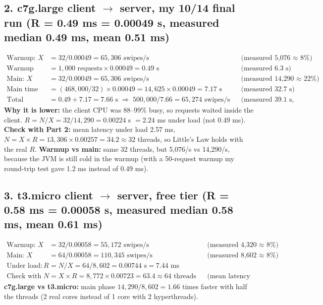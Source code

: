 \documentclass[10pt]{article}
\begin{document}
{\subsection*{2. c7g.large client $\to$ server, my 10/14 final run (R = 0.49 ms = 0.00049 s, measured median 0.49 ms, mean 0.51 ms)}
\begin{align*}
\text{Warmup: } X &= 32 / 0.00049 = 65{,}306 \text{ swipes/s} &&\text{(measured 5,076 $\approx$ 8\%)}\\
\text{Warmup time} &= 1{,}000 \text{ requests} \times 0.00049 = 0.49 \text{ s} &&\text{(measured 6.3 s)}\\
\text{Main: } X &= 32 / 0.00049 = 65{,}306 \text{ swipes/s} &&\text{(measured 14,290 $\approx$ 22\%)}\\
\text{Main time} &= (468{,}000 / 32) \times 0.00049 = 14{,}625 \times 0.00049 = 7.17 \text{ s} &&\text{(measured 32.7 s)}\\
\text{Total} &= 0.49 + 7.17 = 7.66 \text{ s} \;\Rightarrow\; 500{,}000 / 7.66 = 65{,}274 \text{ swipes/s} &&\text{(measured 39.1 s, 12,803/s)}
\end{align*}
\textbf{Why it is lower:} the client CPU was 88--99\% busy, so requests waited inside the client. $R = N/X = 32 / 14{,}290 = 0.00224$ s $= 2.24$ ms under load (not 0.49 ms). \textbf{Check with Part 2:} mean latency under load 2.57 ms, $N = X \times R = 13{,}306 \times 0.00257 = 34.2 \approx 32$ threads, so Little's Law holds with the real $R$. \textbf{Warmup vs main:} same 32 threads, but 5,076/s vs 14,290/s, because the JVM is still cold in the warmup (with a 50-request warmup my round-trip test gave 1.2 ms instead of 0.49 ms).

\subsection*{3. t3.micro client $\to$ server, free tier (R = 0.58 ms = 0.00058 s, measured median 0.58 ms, mean 0.61 ms)}
\begin{align*}
\text{Warmup: } X &= 32 / 0.00058 = 55{,}172 \text{ swipes/s} &&\text{(measured 4,320 $\approx$ 8\%)}\\
\text{Main: } X &= 64 / 0.00058 = 110{,}345 \text{ swipes/s} &&\text{(measured 8,602 $\approx$ 8\%)}\\
\text{Under load: } R &= N / X = 64 / 8{,}602 = 0.00744 \text{ s} = 7.44 \text{ ms}\\
\text{Check with Part 2: } N &= X \times R = 8{,}772 \times 0.00723 = 63.4 \approx 64 \text{ threads} &&\text{(mean latency 7.23 ms)}
\end{align*}
\textbf{c7g.large vs t3.micro:} main phase $14{,}290 / 8{,}602 = 1.66$ times faster with half the threads (2 real cores instead of 1 core with 2 hyperthreads).

}
\end{document}
